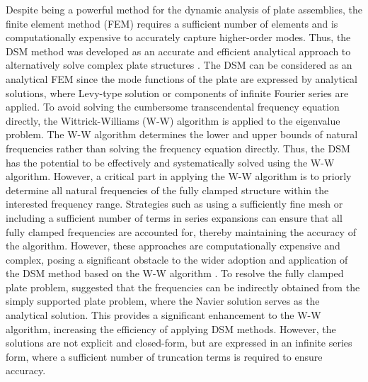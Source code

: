 \documentclass[preprint,12pt]{elsarticle}
\begin{document}
Despite being a powerful method for the dynamic analysis of plate assemblies, the finite element method (FEM) requires a sufficient number of elements and is computationally expensive to accurately capture higher-order modes.
Thus, the DSM method was developed as an accurate and efficient analytical approach to alternatively solve complex plate structures \cite{boscolo2011dynamic,fazzolari2013exact}. 
The DSM can be considered as an analytical FEM since the mode functions of the plate are expressed by analytical solutions, where Levy-type solution \cite{ghorbel2015dynamic} or components of infinite Fourier series \cite{banerjee2015dynamic,liu2016free} are applied.
To avoid solving the cumbersome transcendental frequency equation directly, the Wittrick-Williams (W-W) algorithm \cite{wittrick1971general} is applied to the eigenvalue problem.
The W-W algorithm determines the lower and upper bounds of natural frequencies rather than solving the frequency equation directly. 
Thus, the DSM has the potential to be effectively and systematically solved using the W-W algorithm.
However, a critical part in applying the W-W algorithm is to priorly determine all natural frequencies of the fully clamped structure within the interested frequency range.
Strategies such as using a sufficiently fine mesh or including a sufficient number of terms in series expansions \cite{banerjee2015dynamic} can ensure that all fully clamped frequencies are accounted for, thereby maintaining the accuracy of the algorithm. However, these approaches are computationally expensive and complex, posing a significant obstacle to the wider adoption and application of the DSM method based on the W-W algorithm \cite{han2018improved}.
To resolve the fully clamped plate problem, \citet{liu2015exact} suggested that the frequencies can be indirectly obtained from the simply supported plate problem, where the Navier solution serves as the analytical solution. This provides a significant enhancement to the W-W algorithm, increasing the efficiency of applying DSM methods. 
However, the solutions are not explicit and closed-form, but are expressed in an infinite series form, where a sufficient number of truncation terms is required to ensure accuracy.
\end{document}
